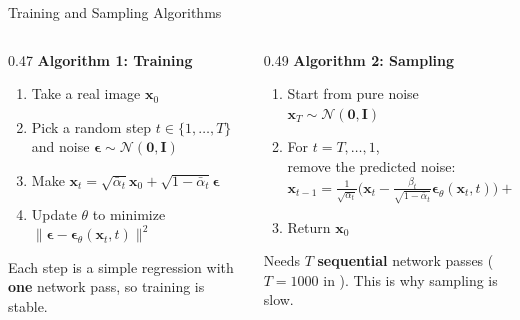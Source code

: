 \documentclass[11pt,aspectratio=169]{beamer}
\newcommand{\Head}[1]{\textcolor{Main}{\textbf{#1}}}
\begin{document}
\begin{frame}{Training and Sampling Algorithms}
  \begin{columns}[T,onlytextwidth]
    \begin{column}{0.47\textwidth}
      \Head{Algorithm 1: Training}
      \vspace{0.1cm}
      \begin{enumerate}
        \item Take a real image $\mathbf{x}_0$
        \item Pick a random step $t\in\{1,\dots,T\}$ and noise $\bm\epsilon\sim\mathcal{N}(\mathbf{0},\mathbf{I})$
        \item Make $\mathbf{x}_t=\sqrt{\bar\alpha_t}\mathbf{x}_0+\sqrt{1-\bar\alpha_t}\bm\epsilon$
        \item Update $\theta$ to minimize $\|\bm\epsilon-\bm\epsilon_\theta(\mathbf{x}_t,t)\|^2$
      \end{enumerate}
      \vspace{0.15cm}
      \small\color{black!75}
      Each step is a simple regression with \textbf{one} network pass, so training is stable.
    \end{column}
    \begin{column}{0.49\textwidth}
      \Head{Algorithm 2: Sampling}
      \vspace{0.1cm}
      \begin{enumerate}
        \item Start from pure noise $\mathbf{x}_T\sim\mathcal{N}(\mathbf{0},\mathbf{I})$
        \item For $t=T,\dots,1$, \\ remove the predicted noise:
      \[ \mathbf{x}_{t-1}=\tfrac{1}{\sqrt{\alpha_t}}\Big(\mathbf{x}_t-\tfrac{\beta_t}{\sqrt{1-\bar\alpha_t}}\bm\epsilon_\theta(\mathbf{x}_t,t)\Big)+\sigma_t\mathbf{z} \]
        \par\vspace{-0.18cm}
        \item Return $\mathbf{x}_0$
      \end{enumerate}
      \vspace{0.05cm}
      \small\color{black!75}
      Needs $T$ \textbf{sequential} network passes ($T=1000$ in \cite{ho2020denoising}). This is why sampling is slow.
    \end{column}
  \end{columns}
\end{frame}
\end{document}
